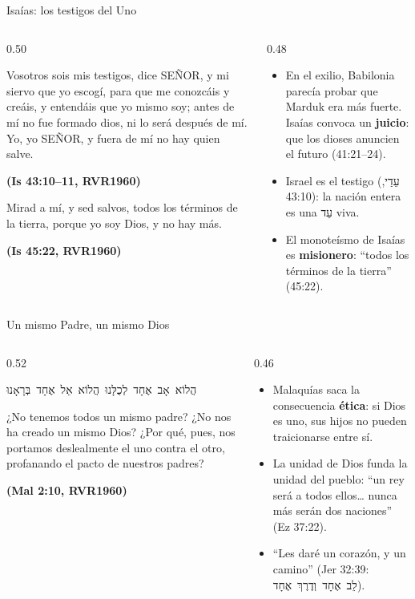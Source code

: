 \documentclass[hyperref={bookmarks=false},aspectratio=169]{beamer}
\newcommand{\heb}[1]{\mbox{\foreignlanguage{hebrew}{#1}}}
\newcommand{\SENOR}{S{\fontsize{0.78em}{1em}\selectfont EÑOR}}
\newcommand{\fuente}[1]{\par\hfill{\upshape\bfseries\footnotesize\textcolor{azul}{#1}}}
\newcommand{\destacar}[1]{\textbf{\textcolor{azul}{#1}}}
\begin{document}
\begin{frame}{Isaías: los testigos del Uno}
\begin{columns}[t,onlytextwidth]
\begin{column}{0.50\textwidth}
\begin{cita}[fontupper=\scriptsize\itshape]Vosotros sois mis testigos, dice \SENOR, y mi siervo que yo escogí, para que me conozcáis y creáis, y entendáis que yo mismo soy; antes de mí no fue formado dios, ni lo será después de mí. Yo, yo \SENOR, y fuera de mí no hay quien salve.\fuente{(Is 43:10--11, RVR1960)}\end{cita}
\begin{cita}[fontupper=\scriptsize\itshape]Mirad a mí, y sed salvos, todos los términos de la tierra, porque yo soy Dios, y no hay más.\fuente{(Is 45:22, RVR1960)}\end{cita}
\end{column}
\begin{column}{0.48\textwidth}\small
\begin{itemize}
\item En el exilio, Babilonia parecía probar que Marduk era más fuerte. Isaías convoca un \destacar{juicio}: que los dioses anuncien el futuro (41:21--24).
\item Israel es el testigo (\heb{עֵדַי}, 43:10): la nación entera es una \heb{עֵד} viva.
\item El monoteísmo de Isaías es \destacar{misionero}: ``todos los términos de la tierra'' (45:22).
\end{itemize}
\end{column}
\end{columns}
\end{frame}

\begin{frame}{Un mismo Padre, un mismo Dios}
\begin{columns}[c,onlytextwidth]
\begin{column}{0.52\textwidth}
\begin{center}\small\heb{הֲלוֹא אָב אֶחָד לְכֻלָּנוּ הֲלוֹא אֵל אֶחָד בְּרָאָנוּ}\end{center}
\begin{cita}¿No tenemos todos un mismo padre? ¿No nos ha creado un mismo Dios? ¿Por qué, pues, nos portamos deslealmente el uno contra el otro, profanando el pacto de nuestros padres?\fuente{(Mal 2:10, RVR1960)}\end{cita}
\end{column}
\begin{column}{0.46\textwidth}\small
\begin{itemize}
\item Malaquías saca la consecuencia \destacar{ética}: si Dios es uno, sus hijos no pueden traicionarse entre sí.
\item La unidad de Dios funda la unidad del pueblo: ``un rey será a todos ellos\ldots{} nunca más serán dos naciones'' (Ez 37:22).
\item ``Les daré un corazón, y un camino'' (Jer 32:39: \heb{לֵב אֶחָד וְדֶרֶךְ אֶחָד}).
\end{itemize}
\end{column}
\end{columns}
\end{frame}
\end{document}

